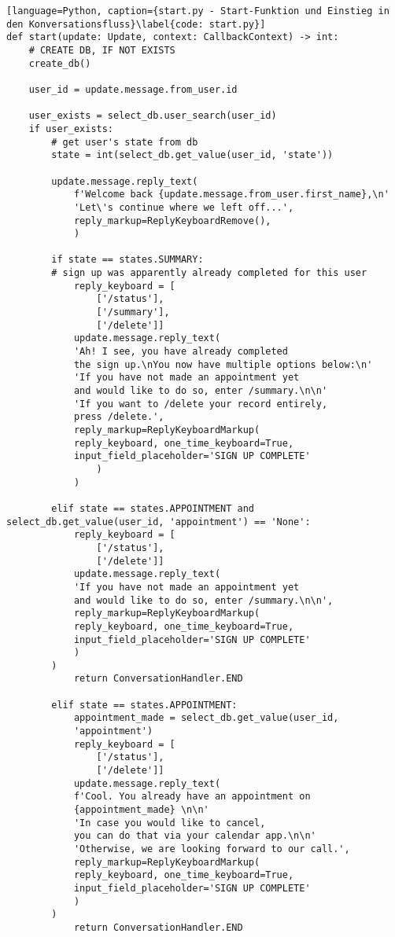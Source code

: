         \begin{lstlisting}[language=Python, caption={start.py - Start-Funktion und Einstieg in den Konversationsfluss}\label{code: start.py}]
def start(update: Update, context: CallbackContext) -> int:
    # CREATE DB, IF NOT EXISTS
    create_db()

    user_id = update.message.from_user.id

    user_exists = select_db.user_search(user_id)
    if user_exists:
        # get user's state from db
        state = int(select_db.get_value(user_id, 'state'))

        update.message.reply_text(
            f'Welcome back {update.message.from_user.first_name},\n'
            'Let\'s continue where we left off...',
            reply_markup=ReplyKeyboardRemove(),
            )

        if state == states.SUMMARY:  
        # sign up was apparently already completed for this user
            reply_keyboard = [
                ['/status'], 
                ['/summary'],
                ['/delete']]
            update.message.reply_text(
            'Ah! I see, you have already completed 
            the sign up.\nYou now have multiple options below:\n'
            'If you have not made an appointment yet 
            and would like to do so, enter /summary.\n\n'
            'If you want to /delete your record entirely, 
            press /delete.',
            reply_markup=ReplyKeyboardMarkup(
            reply_keyboard, one_time_keyboard=True, 
            input_field_placeholder='SIGN UP COMPLETE'
                )
            )

        elif state == states.APPOINTMENT and select_db.get_value(user_id, 'appointment') == 'None':
            reply_keyboard = [
                ['/status'], 
                ['/delete']]
            update.message.reply_text(
            'If you have not made an appointment yet 
            and would like to do so, enter /summary.\n\n',
            reply_markup=ReplyKeyboardMarkup(
            reply_keyboard, one_time_keyboard=True, 
            input_field_placeholder='SIGN UP COMPLETE'
            )
        )
            return ConversationHandler.END

        elif state == states.APPOINTMENT:
            appointment_made = select_db.get_value(user_id, 
            'appointment')
            reply_keyboard = [
                ['/status'], 
                ['/delete']]
            update.message.reply_text(
            f'Cool. You already have an appointment on 
            {appointment_made} \n\n'
            'In case you would like to cancel, 
            you can do that via your calendar app.\n\n'
            'Otherwise, we are looking forward to our call.',
            reply_markup=ReplyKeyboardMarkup(
            reply_keyboard, one_time_keyboard=True, 
            input_field_placeholder='SIGN UP COMPLETE'
            )
        )
            return ConversationHandler.END
        

\end{lstlisting}

